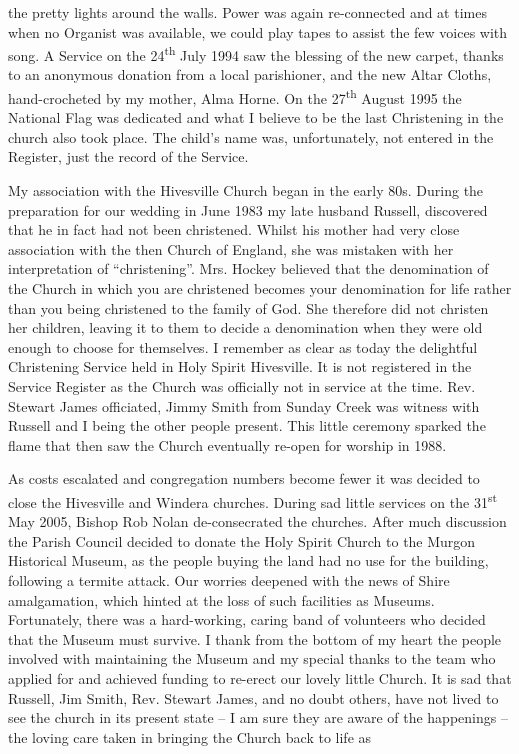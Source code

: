 the pretty lights around the walls. Power was again re-connected and at
times when no Organist was available, we could play tapes to assist the
few voices with song. A Service on the 24\textsuperscript{th} July 1994
saw the blessing of the new carpet, thanks to an anonymous donation from
a local parishioner, and the new Altar Cloths, hand-crocheted by my
mother, Alma Horne. On the 27\textsuperscript{th} August 1995 the
National Flag was dedicated and what I believe to be the last
Christening in the church also took place. The child's name was,
unfortunately, not entered in the Register, just the record of the
Service.

My association with the Hivesville Church began in the early 80s. During
the preparation for our wedding in June 1983 my late husband Russell,
discovered that he in fact had not been christened. Whilst his mother
had very close association with the then Church of England, she was
mistaken with her interpretation of ``christening''. Mrs. Hockey
believed that the denomination of the Church in which you are christened
becomes your denomination for life rather than you being christened to
the family of God. She therefore did not christen her children, leaving
it to them to decide a denomination when they were old enough to choose
for themselves. I remember as clear as today the delightful Christening
Service held in Holy Spirit Hivesville. It is not registered in the
Service Register as the Church was officially not in service at the
time. Rev. Stewart James officiated, Jimmy Smith from Sunday Creek was
witness with Russell and I being the other people present. This little
ceremony sparked the flame that then saw the Church eventually re-open
for worship in 1988.

As costs escalated and congregation numbers become fewer it was decided
to close the Hivesville and Windera churches. During sad little services
on the 31\textsuperscript{st} May 2005, Bishop Rob Nolan de-consecrated
the churches. After much discussion the Parish Council decided to donate
the Holy Spirit Church to the Murgon Historical Museum, as the people
buying the land had no use for the building, following a termite attack.
Our worries deepened with the news of Shire amalgamation, which hinted
at the loss of such facilities as Museums. Fortunately, there was a
hard-working, caring band of volunteers who decided that the Museum must
survive. I thank from the bottom of my heart the people involved with
maintaining the Museum and my special thanks to the team who applied for
and achieved funding to re-erect our lovely little Church. It is sad
that Russell, Jim Smith, Rev. Stewart James, and no doubt others, have
not lived to see the church in its present state -- I am sure they are
aware of the happenings -- the loving care taken in bringing the Church
back to life as

